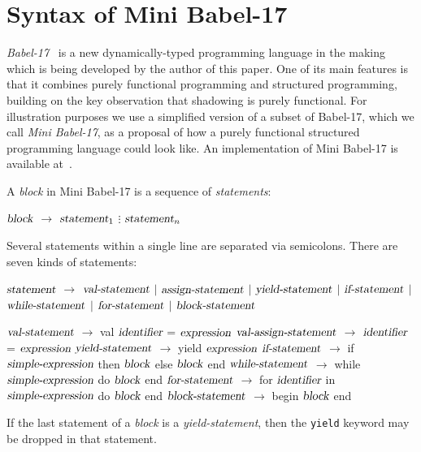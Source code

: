 \documentclass{llncs}
\newcommand{\bsrc}[1] {\lstinline!#1!}
\begin{document}
\section{Syntax of Mini Babel-17}
\emph{Babel-17}~\cite{babel17} is a new dynamically-typed programming language in the making which is being developed by the author of this paper. One of its main features is that it combines purely functional programming and structured programming, building on the key observation that shadowing is purely functional. For illustration purposes we use a simplified version of a subset of Babel-17, which we call \emph{Mini Babel-17}, as a proposal of how a purely functional structured programming language could look like. An implementation of  Mini Babel-17 is available at~\cite{minibabel17}.

A \emph{block} in Mini Babel-17 is a sequence of \emph{statements}:
\begin{babellisting}
$\textsl{block}$ $\longrightarrow$ $\textsl{statement}_1$
              $\vdots$
          $\textsl{statement}_n$

\end{babellisting}
Several statements within a single line are separated via semicolons. There are seven kinds of statements: 
\begin{babellisting}
$\textsl{statement}$ $\longrightarrow$ $\textsl{val-statement}$
            $|$  $\textsl{assign-statement}$
            $|$  $\textsl{yield-statement}$
            $|$  $\textsl{if-statement}$
            $|$  $\textsl{while-statement}$
            $|$  $\textsl{for-statement}$
            $|$  $\textsl{block-statement}$            

$\textsl{val-statement}$ $\longrightarrow$ val $\textsl{identifier}$ = $\textsl{expression}$
$\textsl{val-assign-statement}$ $\longrightarrow$ $\textsl{identifier}$ = $\textsl{expression}$
$\textsl{yield-statement}$ $\longrightarrow$ yield $\textsl{expression}$ 
$\textsl{if-statement}$ $\longrightarrow$ if $\textsl{simple-expression}$ then $\textsl{block}$ else $\textsl{block}$ end 
$\textsl{while-statement}$ $\longrightarrow$ while $\textsl{simple-expression}$ do $\textsl{block}$ end 
$\textsl{for-statement}$ $\longrightarrow$ for $\textsl{identifier}$ in $\textsl{simple-expression}$ do $\textsl{block}$ end 
$\textsl{block-statement}$ $\longrightarrow$ begin $\textsl{block}$ end 
\end{babellisting}
If the last statement of a \emph{block} is  a \emph{yield-statement}, then the \bsrc{yield} keyword may be dropped in that statement. 
\end{document}
